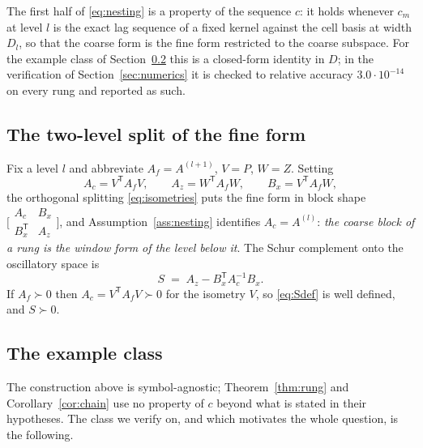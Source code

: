 \documentclass[11pt,a4paper]{article}
\theoremstyle{plain}
\theoremstyle{definition}
\newcommand{\T}{\mathsf{T}}
\newcommand{\PD}{\succ 0}
\begin{document}
The first half of \eqref{eq:nesting} is a property of the sequence $c$: it holds
whenever $c_{m}$ at level $l$ is the exact lag sequence of a fixed kernel against the
cell basis at width $D_{l}$, so that the coarse form is the fine form restricted to
the coarse subspace. For the example class of Section~\ref{sec:example} this is a
closed-form identity in $D$; in the verification of Section~\ref{sec:numerics} it is
checked to relative accuracy $3.0\cdot10^{-14}$ on every rung and reported as such.

\subsection{The two-level split of the fine form}
\label{sec:split}

Fix a level $l$ and abbreviate $A_{f}=A^{(l+1)}$, $V=P$, $W=Z$. Setting
\begin{equation}
\label{eq:blocks}
  A_{c}=V^{\T}A_{f}V,\qquad
  A_{z}=W^{\T}A_{f}W,\qquad
  B_{x}=V^{\T}A_{f}W,
\end{equation}
the orthogonal splitting \eqref{eq:isometries} puts the fine form in block shape
$\bigl[\begin{smallmatrix}A_{c}&B_{x}\\ B_{x}^{\T}&A_{z}\end{smallmatrix}\bigr]$, and
Assumption~\ref{ass:nesting} identifies $A_{c}=A^{(l)}$: \emph{the coarse block of a
rung is the window form of the level below it}. The Schur complement onto the
oscillatory space is
\begin{equation}
\label{eq:Sdef}
  S \;=\; A_{z}-B_{x}^{\T}A_{c}^{-1}B_{x} .
\end{equation}
If $A_{f}\PD$ then $A_{c}=V^{\T}A_{f}V\PD$ for the isometry $V$, so \eqref{eq:Sdef}
is well defined, and $S\PD$.

\subsection{The example class}
\label{sec:example}

The construction above is symbol-agnostic; Theorem~\ref{thm:rung} and
Corollary~\ref{cor:chain} use no property of $c$ beyond what is stated in their
hypotheses. The class we verify on, and which motivates the whole question, is the
following.
\end{document}
